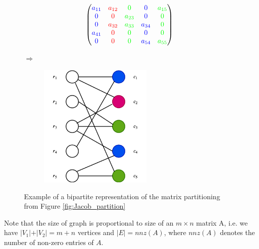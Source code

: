 	\begin{figure}[H]
		\centering
		\begin{subfigure}{0.45\linewidth}
			$$ \left(\begin{matrix}
			{\color{blue} a_{11}} & {\color{red} a_{12}} & {\color{green} 0 }        &
			{\color{blue} 0 }       & {\color{green} a_{15}} \\
			{\color{blue} 0}        & {\color{red} 0 }       & {\color{green} a_{23}}  &
			{\color{blue} 0 }      & {\color{green} 0} \\
			{\color{blue} 0}        & {\color{red} a_{32}} &  {\color{green} a_{33}}  &
			{\color{blue} a_{34}} & {\color{green} 0 } \\
			{\color{blue} a_{41}} & {\color{red} 0 }       & {\color{green} 0 }         &
			{\color{blue} 0 }        & {\color{green} 0} \\
			{\color{blue} 0 }       & {\color{red} 0 }       & {\color{green} 0 }         &
			{\color{blue} a_{54}} & {\color{green} a_{55} }
			\end{matrix}\right) $$
		\end{subfigure}
		$\Rightarrow$ \hfill
		\begin{subfigure}{0.45\linewidth}
			\includegraphics[width=0.6\textwidth]{pics/bipartite.png}
		\end{subfigure}
		\caption{Example of a bipartite representation of the matrix partitioning
			from Figure \ref{fig:Jacob_partition}}
		\label{fig:bipartite}
	\end{figure}
	Note that the size of graph is proportional to size of an $m \times n$ matrix A,
	i.e. we have $\vert V_1 \vert  + \vert V_2 \vert = m + n$ vertices and $\vert E
	\vert = nnz(A)$, where $nnz(A)$ denotes the number of non-zero entries of $A$.
